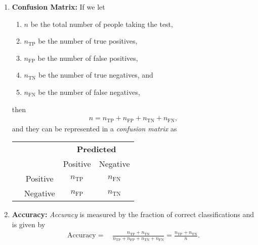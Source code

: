 \documentclass[12pt]{article}
\begin{document}
\begin{enumerate}[label=\textbf{\arabic*.}]
\begin{enumerate}
		\item \textit{False Negative:} If this person actually has cancer but the classifier predicts this person does \emph{not} have cancer, the prediction is called a \emph{false negative}. 
		
	\end{enumerate}
	
	\textit{Remark.} The false positives are also known as \emph{type 1 errors}, and the false negatives are called \emph{type 2 errors}. 
	
	\item \textbf{Confusion Matrix:} If we let 
	\begin{enumerate}
		\item $n$ be the total number of people taking the test, 
		\item $n_{\mathrm{TP}}$ be the number of true positives, 
		\item $n_{\mathrm{FP}}$ be the number of false positives, 
		\item $n_{\mathrm{TN}}$ be the number of true negatives, and 
		\item $n_{\mathrm{FN}}$ be the number of false negatives, 
	\end{enumerate}
	then 
	\begin{align*}
		n = n_{\mathrm{TP}} + n_{\mathrm{FP}} + n_{\mathrm{TN}} + n_{\mathrm{FN}}, 
	\end{align*}
	and they can be represented in a \emph{confusion matrix} as 
	\begin{center}
		\begin{tabular}{@{}cc|cc@{}}
			\multicolumn{1}{c}{} &\multicolumn{1}{c}{} &\multicolumn{2}{c}{\textbf{Predicted}} \\ 
			\multicolumn{1}{c}{} & 
			\multicolumn{1}{c|}{} & 
			\multicolumn{1}{c}{Positive} & 
			\multicolumn{1}{c}{Negative} \\ 
			\cline{2-4}
			\multirow[c]{2}{*}{\rotatebox[origin=tr]{90}{\textbf{Actual}}}
			& Positive  & $n_{\mathrm{TP}}$ & $n_{\mathrm{FN}}$ \\[1.5ex]
			& Negative  & $n_{\mathrm{FP}}$ & $n_{\mathrm{TN}}$ \\ 
			\cline{2-4}
		\end{tabular}
	\end{center}
	
	\item \textbf{Accuracy:} \emph{Accuracy} is measured by the fraction of correct classifications and is given by 
	\begin{align*}
		\mathrm{Accuracy} = & \, \frac{n_{\mathrm{TP}} + n_{\mathrm{TN}}}{n_{\mathrm{TP}} + n_{\mathrm{FP}} + n_{\mathrm{TN}} + n_{\mathrm{FN}}} 
		= \frac{n_{\mathrm{TP}} + n_{\mathrm{TN}}}{n}. 
	\end{align*}
	

\end{enumerate}
\end{document}
